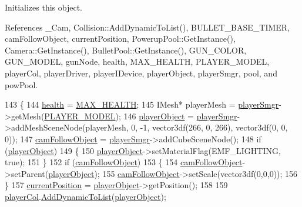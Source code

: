 Initializes this object. 



 

 

References \-\_\-\-Cam, Collision\-::\-Add\-Dynamic\-To\-List(), B\-U\-L\-L\-E\-T\-\_\-\-B\-A\-S\-E\-\_\-\-T\-I\-M\-E\-R, cam\-Follow\-Object, current\-Position, Powerup\-Pool\-::\-Get\-Instance(), Camera\-::\-Get\-Instance(), Bullet\-Pool\-::\-Get\-Instance(), G\-U\-N\-\_\-\-C\-O\-L\-O\-R, G\-U\-N\-\_\-\-M\-O\-D\-E\-L, gun\-Node, health, M\-A\-X\-\_\-\-H\-E\-A\-L\-T\-H, P\-L\-A\-Y\-E\-R\-\_\-\-M\-O\-D\-E\-L, player\-Col, player\-Driver, player\-I\-Device, player\-Object, player\-Smgr, pool, and pow\-Pool.


\begin{DoxyCode}
143 \{
144     \hyperlink{_player_8cpp_ae436015bd00ce552ac0bc6eefe3b8e00}{health} = \hyperlink{_player_8cpp_a2cf38e1cf676620c959917828e2eac9d}{MAX\_HEALTH};
145     IMesh* playerMesh = \hyperlink{_player_8cpp_a1f903054d84bef85b61fea5eb6eca726}{playerSmgr}->getMesh(\hyperlink{_player_8cpp_a5a978dc5c1ca28edd5782e9edec2ca5c}{PLAYER\_MODEL});
146     \hyperlink{_player_8cpp_a0dc161b57661226afd81ffc4ba4f21d9}{playerObject} = \hyperlink{_player_8cpp_a1f903054d84bef85b61fea5eb6eca726}{playerSmgr}->addMeshSceneNode(playerMesh, 0, -1, vector3df(266, 0, 
      266), vector3df(0, 0, 0));
147     \hyperlink{_player_8cpp_a017569baead2c823210b5aacb68c3661}{camFollowObject} = \hyperlink{_player_8cpp_a1f903054d84bef85b61fea5eb6eca726}{playerSmgr}->addCubeSceneNode();
148     \textcolor{keywordflow}{if} (\hyperlink{_player_8cpp_a0dc161b57661226afd81ffc4ba4f21d9}{playerObject})
149     \{
150         \hyperlink{_player_8cpp_a0dc161b57661226afd81ffc4ba4f21d9}{playerObject}->setMaterialFlag(EMF\_LIGHTING, \textcolor{keyword}{true});
151     \}
152     \textcolor{keywordflow}{if} (\hyperlink{_player_8cpp_a017569baead2c823210b5aacb68c3661}{camFollowObject}) 
153     \{
154         \hyperlink{_player_8cpp_a017569baead2c823210b5aacb68c3661}{camFollowObject}->setParent(\hyperlink{_player_8cpp_a0dc161b57661226afd81ffc4ba4f21d9}{playerObject});
155         \hyperlink{_player_8cpp_a017569baead2c823210b5aacb68c3661}{camFollowObject}->setScale(vector3df(0,0,0));
156     \}
157     \hyperlink{_player_8cpp_a03b83ef76d66d83d5eb75ce553ec0ec6}{currentPosition} = \hyperlink{_player_8cpp_a0dc161b57661226afd81ffc4ba4f21d9}{playerObject}->getPosition();
158 
159     \hyperlink{_player_8cpp_a3ea8274de548d0594347dd6a211fa395}{playerCol}.\hyperlink{class_collision_a48551c4c00be185dc16cf27775bd177b}{AddDynamicToList}(\hyperlink{_player_8cpp_a0dc161b57661226afd81ffc4ba4f21d9}{playerObject});

\end{DoxyCode}

